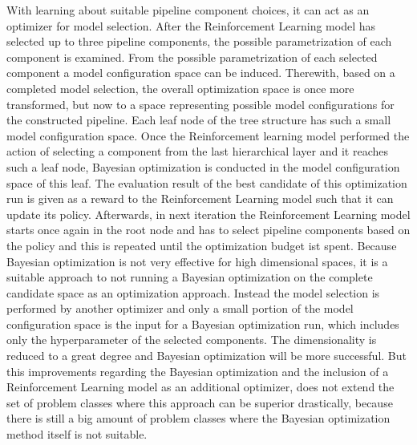 With learning about suitable pipeline component choices, it can act as an optimizer for model selection.\newline
After the Reinforcement Learning model has selected up to three pipeline components, the possible parametrization of each component is examined.
From the possible parametrization of each selected component a model configuration space can be induced.
Therewith, based on a completed model selection, the overall optimization space is once more transformed, but now to a space representing possible model configurations for the constructed pipeline.
Each leaf node of the tree structure has such a small model configuration space.\newline
Once the Reinforcement learning model performed the action of selecting a component from the last hierarchical layer and it reaches such a leaf node, Bayesian optimization is conducted in the model configuration space of this leaf.
The evaluation result of the best candidate of this optimization run is given as a reward to the Reinforcement Learning model such that it can update its policy.
Afterwards, in next iteration the Reinforcement Learning model starts once again in the root node and has to select pipeline components based on the policy and this is repeated until the optimization budget ist spent.\newline
Because Bayesian optimization is not very effective for high dimensional spaces, it is a suitable approach to not running a Bayesian optimization on the complete candidate space as an optimization approach.
Instead the model selection is performed by another optimizer and only a small portion of the model configuration space is the input for a Bayesian optimization run, which includes only the hyperparameter of the selected components.
The dimensionality is reduced to a great degree and Bayesian optimization will be more successful.\newline
But this improvements regarding the Bayesian optimization and the inclusion of a Reinforcement Learning model as an additional optimizer, does not extend the set of problem classes where this approach can be superior drastically, because there is still a big amount of problem classes where the Bayesian optimization method itself is not suitable.


